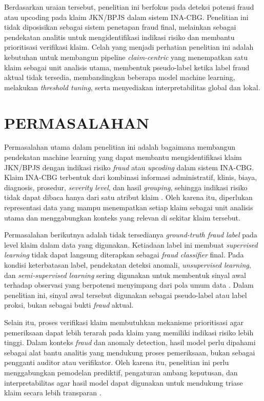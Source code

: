 Berdasarkan uraian tersebut, penelitian ini berfokus pada deteksi potensi fraud atau upcoding pada klaim JKN/BPJS dalam sistem INA-CBG. Penelitian ini tidak diposisikan sebagai sistem penetapan fraud final, melainkan sebagai pendekatan analitis untuk mengidentifikasi indikasi risiko dan membantu prioritisasi verifikasi klaim. Celah yang menjadi perhatian penelitian ini adalah kebutuhan untuk membangun pipeline \textit{claim-centric} yang menempatkan satu klaim sebagai unit analisis utama, membentuk pseudo-label ketika label fraud aktual tidak tersedia, membandingkan beberapa model machine learning, melakukan \textit{threshold tuning}, serta menyediakan interpretabilitas global dan lokal.

\section{PERMASALAHAN}

Permasalahan utama dalam penelitian ini adalah bagaimana membangun pendekatan machine learning yang dapat membantu mengidentifikasi klaim JKN/BPJS dengan indikasi risiko \textit{fraud} atau \textit{upcoding} dalam sistem INA-CBG. Klaim INA-CBG terbentuk dari kombinasi informasi administratif, klinis, biaya, diagnosis, prosedur, \textit{severity level}, dan hasil \textit{grouping}, sehingga indikasi risiko tidak dapat dibaca hanya dari satu atribut klaim \citep{kemenkes2016}. Oleh karena itu, diperlukan representasi data yang mampu menempatkan setiap klaim sebagai unit analisis utama dan menggabungkan konteks yang relevan di sekitar klaim tersebut.

Permasalahan berikutnya adalah tidak tersedianya \textit{ground-truth fraud label} pada level klaim dalam data yang digunakan. Ketiadaan label ini membuat \textit{supervised learning} tidak dapat langsung diterapkan sebagai \textit{fraud classifier} final. Pada kondisi keterbatasan label, pendekatan deteksi anomali, \textit{unsupervised learning}, dan \textit{semi-supervised learning} sering digunakan untuk membentuk sinyal awal terhadap observasi yang berpotensi menyimpang dari pola umum data \citep{shekhar2023,settipalli2023,meulemeester2025,bakker2025}. Dalam penelitian ini, sinyal awal tersebut digunakan sebagai pseudo-label atau label proksi, bukan sebagai bukti \textit{fraud} aktual.

Selain itu, proses verifikasi klaim membutuhkan mekanisme prioritisasi agar pemeriksaan dapat lebih terarah pada klaim yang memiliki indikasi risiko lebih tinggi. Dalam konteks \textit{fraud} dan anomaly detection, hasil model perlu dipahami sebagai alat bantu analitis yang mendukung proses pemeriksaan, bukan sebagai pengganti auditor atau verifikator. Oleh karena itu, penelitian ini perlu menggabungkan pemodelan prediktif, pengaturan ambang keputusan, dan interpretabilitas agar hasil model dapat digunakan untuk mendukung triase klaim secara lebih transparan \citep{wang2025,ribeiro2016,lundberg2017,salih2025}.

